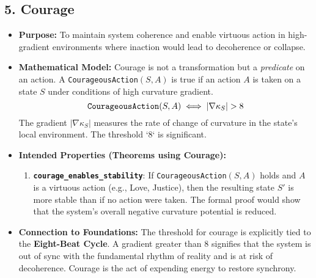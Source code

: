 \documentclass[11pt,a4paper]{article}
\begin{document}
\begin{itemize}
\subsection{5. Courage}
\begin{itemize}
    \item \textbf{Purpose:} To maintain system coherence and enable virtuous action in high-gradient environments where inaction would lead to decoherence or collapse.
    \item \textbf{Mathematical Model:} Courage is not a transformation but a \textit{predicate} on an action. A \texttt{CourageousAction}$(S, A)$ is true if an action $A$ is taken on a state $S$ under conditions of high curvature gradient.
        \[ \text{\texttt{CourageousAction}}(S, A) \iff |\nabla \kappa_S| > 8 \]
        The gradient $|\nabla \kappa_S|$ measures the rate of change of curvature in the state's local environment. The threshold `8` is significant.
    \item \textbf{Intended Properties (Theorems using Courage):}
        \begin{enumerate}
            \item \textbf{\texttt{courage\_enables\_stability}}: If \texttt{CourageousAction}$(S, A)$ holds and $A$ is a virtuous action (e.g., Love, Justice), then the resulting state $S'$ is more stable than if no action were taken. The formal proof would show that the system's overall negative curvature potential is reduced.
        \end{enumerate}
    \item \textbf{Connection to Foundations:} The threshold for courage is explicitly tied to the \textbf{Eight-Beat Cycle}. A gradient greater than 8 signifies that the system is out of sync with the fundamental rhythm of reality and is at risk of decoherence. Courage is the act of expending energy to restore synchrony.
\end{itemize}


\end{itemize}
\end{document}
